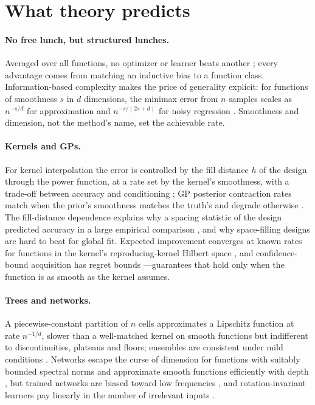 \section{What theory predicts}
\label{sec:theory}

\paragraph{No free lunch, but structured lunches.} Averaged over all functions, no optimizer or learner beats another
\cite{wolpert1997no}; every advantage comes from matching an inductive bias to a function class. Information-based
complexity makes the price of generality explicit: for functions of smoothness $s$ in $d$ dimensions, the minimax error
from $n$ samples scales as $n^{-s/d}$ for approximation and $n^{-s/(2s+d)}$ for noisy regression
\cite{novak2008tractability,stone1982optimal}. Smoothness and dimension, not the method's name, set the achievable rate.

\paragraph{Kernels and GPs.} For kernel interpolation the error is controlled by the fill distance $h$ of the design
through the power function, at a rate set by the kernel's smoothness, with a trade-off between accuracy and conditioning
\cite{wendland2004scattered,schaback1995error}; GP posterior contraction rates match when the prior's smoothness matches
the truth's and degrade otherwise \cite{vandervaart2011information}. The fill-distance dependence explains why a spacing
statistic of the design predicted accuracy in a large empirical comparison \cite{williams2021novel}, and why space-filling
designs are hard to beat for global fit. Expected improvement converges at known rates for functions in the kernel's
reproducing-kernel Hilbert space \cite{bull2011convergence}, and confidence-bound acquisition has regret bounds
\cite{srinivas2010gaussian}---guarantees that hold only when the function is as smooth as the kernel assumes.

\paragraph{Trees and networks.} A piecewise-constant partition of $n$ cells approximates a Lipschitz function at rate
$n^{-1/d}$, slower than a well-matched kernel on smooth functions but indifferent to discontinuities, plateaus and
floors; ensembles are consistent under mild conditions \cite{biau2016random}. Networks escape the curse of dimension for
functions with suitably bounded spectral norms \cite{barron1993universal} and approximate smooth functions efficiently
with depth \cite{yarotsky2017error}, but trained networks are biased toward low frequencies \cite{rahaman2019spectral},
and rotation-invariant learners pay linearly in the number of irrelevant inputs \cite{ng2004feature}.

